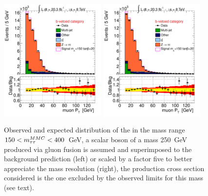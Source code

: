 \begin{figure}[tp]
  \centering
            \includegraphics[page=5, width=0.47\textwidth]{figure/final_plots/Bveto_final.pdf}
            \includegraphics[page=12, width=0.47\textwidth]{figure/final_plots/Bveto_final.pdf}
    \caption{ Observed and expected distribution of the \mmc in the mass range $150 < m_{\tau\tau}^{MMC} < 400 $~GeV, a scalar boson 
	of a mass 250~GeV produced via gluon fusion is assumed and  superimposed to the background prediction (left) 
	or scaled by a factor five to better appreciate the mass resolution (right), the production cross section considered is the one excluded
	by the observed limits for this mass (see text).}
	
\label{fig:excess}
\end{figure}



